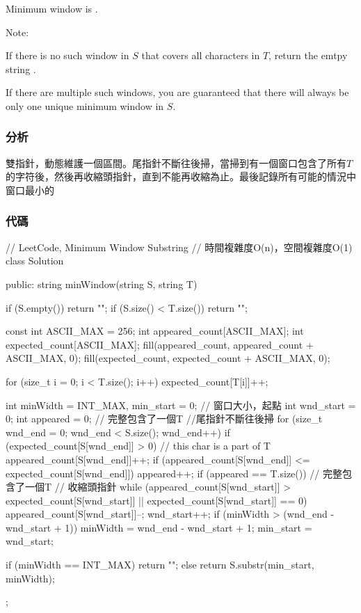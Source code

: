 Minimum window is .

Note:
\begindot
\item If there is no such window in $S$ that covers all characters in $T$, return the emtpy string .
\item If there are multiple such windows, you are guaranteed that there will always be only one unique minimum window in $S$.
\myenddot


\subsubsection{分析}
雙指針，動態維護一個區間。尾指針不斷往後掃，當掃到有一個窗口包含了所有$T$的字符後，然後再收縮頭指針，直到不能再收縮為止。最後記錄所有可能的情況中窗口最小的


\subsubsection{代碼}
\begin{Code}
// LeetCode, Minimum Window Substring
// 時間複雜度O(n)，空間複雜度O(1)
class Solution {
public:
    string minWindow(string S, string T) {
        if (S.empty()) return "";
        if (S.size() < T.size()) return "";

        const int ASCII_MAX = 256;
        int appeared_count[ASCII_MAX];
        int expected_count[ASCII_MAX];
        fill(appeared_count, appeared_count + ASCII_MAX, 0);
        fill(expected_count, expected_count + ASCII_MAX, 0);

        for (size_t i = 0; i < T.size(); i++) expected_count[T[i]]++;

        int minWidth = INT_MAX, min_start = 0;  // 窗口大小，起點
        int wnd_start = 0;
        int appeared = 0;  // 完整包含了一個T
        //尾指針不斷往後掃
        for (size_t wnd_end = 0; wnd_end < S.size(); wnd_end++) {
            if (expected_count[S[wnd_end]] > 0)  {  // this char is a part of T
                appeared_count[S[wnd_end]]++;
                if (appeared_count[S[wnd_end]] <= expected_count[S[wnd_end]])
                    appeared++;
            }
            if (appeared == T.size()) {  // 完整包含了一個T
                // 收縮頭指針
                while (appeared_count[S[wnd_start]] > expected_count[S[wnd_start]]
                        || expected_count[S[wnd_start]] == 0) {
                    appeared_count[S[wnd_start]]--;
                    wnd_start++;
                }
                if (minWidth > (wnd_end - wnd_start + 1)) {
                    minWidth = wnd_end - wnd_start + 1;
                    min_start = wnd_start;
                }
            }
        }

        if (minWidth == INT_MAX) return "";
        else return S.substr(min_start, minWidth);
    }
};
\end{Code}


